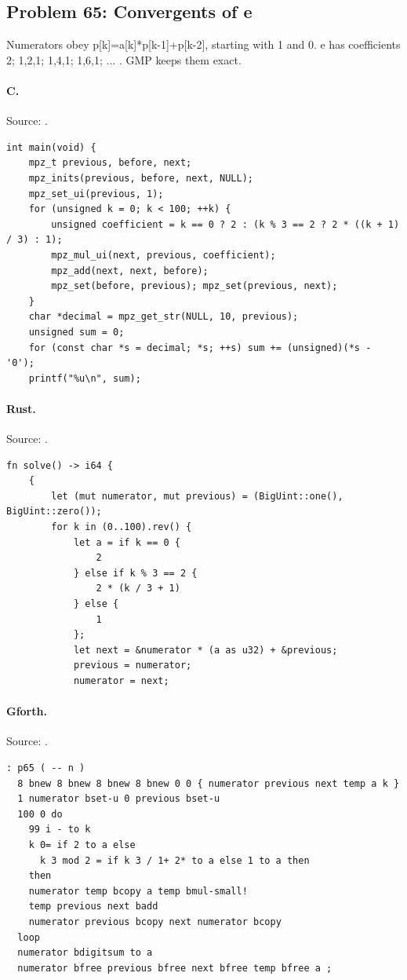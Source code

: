 \subsection{Problem 65: Convergents of e}
\label{walkthrough:p65}
Numerators obey p[k]=a[k]*p[k-1]+p[k-2], starting with 1 and 0. e has coefficients 2; 1,2,1; 1,4,1; 1,6,1; ... . GMP keeps them exact.

\paragraph{C.} Source: .
\begin{lstlisting}
int main(void) {
    mpz_t previous, before, next;
    mpz_inits(previous, before, next, NULL);
    mpz_set_ui(previous, 1);
    for (unsigned k = 0; k < 100; ++k) {
        unsigned coefficient = k == 0 ? 2 : (k % 3 == 2 ? 2 * ((k + 1) / 3) : 1);
        mpz_mul_ui(next, previous, coefficient);
        mpz_add(next, next, before);
        mpz_set(before, previous); mpz_set(previous, next);
    }
    char *decimal = mpz_get_str(NULL, 10, previous);
    unsigned sum = 0;
    for (const char *s = decimal; *s; ++s) sum += (unsigned)(*s - '0');
    printf("%u\n", sum);
\end{lstlisting}

\paragraph{Rust.} Source: .
\begin{lstlisting}
fn solve() -> i64 {
    {
        let (mut numerator, mut previous) = (BigUint::one(), BigUint::zero());
        for k in (0..100).rev() {
            let a = if k == 0 {
                2
            } else if k % 3 == 2 {
                2 * (k / 3 + 1)
            } else {
                1
            };
            let next = &numerator * (a as u32) + &previous;
            previous = numerator;
            numerator = next;
\end{lstlisting}

\paragraph{Gforth.} Source: .
\begin{lstlisting}
: p65 ( -- n )
  8 bnew 8 bnew 8 bnew 8 bnew 0 0 { numerator previous next temp a k }
  1 numerator bset-u 0 previous bset-u
  100 0 do
    99 i - to k
    k 0= if 2 to a else
      k 3 mod 2 = if k 3 / 1+ 2* to a else 1 to a then
    then
    numerator temp bcopy a temp bmul-small!
    temp previous next badd
    numerator previous bcopy next numerator bcopy
  loop
  numerator bdigitsum to a
  numerator bfree previous bfree next bfree temp bfree a ;
\end{lstlisting}

